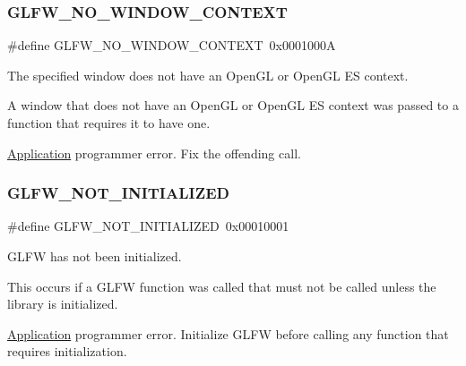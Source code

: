 \subsubsection{\texorpdfstring{G\+L\+F\+W\+\_\+\+N\+O\+\_\+\+W\+I\+N\+D\+O\+W\+\_\+\+C\+O\+N\+T\+E\+XT}{GLFW\_NO\_WINDOW\_CONTEXT}\hspace{0.1cm}{\footnotesize\ttfamily [5/5]}}
{\footnotesize\ttfamily \#define G\+L\+F\+W\+\_\+\+N\+O\+\_\+\+W\+I\+N\+D\+O\+W\+\_\+\+C\+O\+N\+T\+E\+XT~0x0001000A}



The specified window does not have an Open\+GL or Open\+GL ES context. 

A window that does not have an Open\+GL or Open\+GL ES context was passed to a function that requires it to have one.

\hyperlink{classApplication}{Application} programmer error. Fix the offending call. \mbox{\label{group__errors_ga2374ee02c177f12e1fa76ff3ed15e14a}} 
\subsubsection{\texorpdfstring{G\+L\+F\+W\+\_\+\+N\+O\+T\+\_\+\+I\+N\+I\+T\+I\+A\+L\+I\+Z\+ED}{GLFW\_NOT\_INITIALIZED}\hspace{0.1cm}{\footnotesize\ttfamily [1/5]}}
{\footnotesize\ttfamily \#define G\+L\+F\+W\+\_\+\+N\+O\+T\+\_\+\+I\+N\+I\+T\+I\+A\+L\+I\+Z\+ED~0x00010001}



G\+L\+FW has not been initialized. 

This occurs if a G\+L\+FW function was called that must not be called unless the library is initialized.

\hyperlink{classApplication}{Application} programmer error. Initialize G\+L\+FW before calling any function that requires initialization. \mbox{\label{group__errors_ga2374ee02c177f12e1fa76ff3ed15e14a}} 
